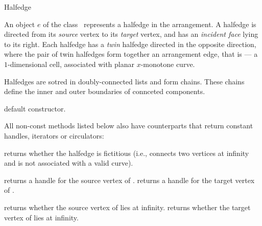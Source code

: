 
\ccRefPageBegin

\begin{ccRefClass}{Halfedge}

\ccThreeToTwo

\ccDefinition
An object $e$ of the class \ccRefName\ represents a halfedge in the
arrangement. A halfedge is directed from its \emph{source} vertex
to its \emph{target} vertex, and has an \emph{incident face} lying to
its right. Each halfedge has a \emph{twin} halfedge directed in the
opposite direction, where the pair of twin halfedges form together
an arrangement edge, that is --- a $1$-dimensional cell, associated
with planar $x$-monotone curve.

Halfedges are sotred in doubly-connected lists and form chains. These
chains define the inner and outer boundaries of connceted components.

\ccInheritsFrom

\ccCreation
{}

   {default constructor.}    	    
    
\ccAccessFunctions

All non-const methods listed below also have  counterparts
that return constant handles, iterators or circulators:

    {returns whether the halfedge is fictitious (i.e., connects two vertices at
     infinity and is not associated with a valid curve).}
    
    {returns a handle for the source vertex of \ccVar{}.}
\ccGlue
{}
    {returns a handle for the target vertex of \ccVar{}.}

    {returns whether the source vertex of \ccVar{} lies at infinity.}
\ccGlue
{}
    {returns whether the target vertex of \ccVar{} lies at infinity.}


\end{ccRefClass}
